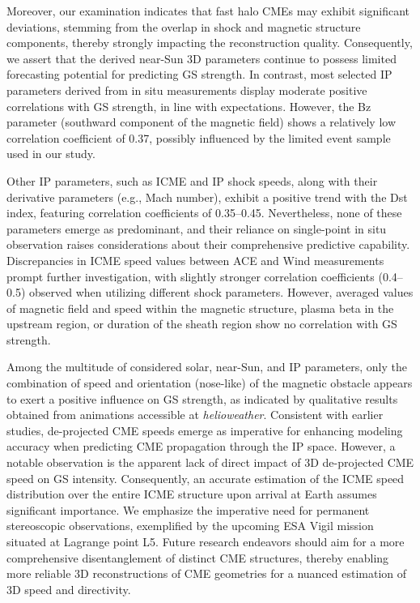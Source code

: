 Moreover, our examination indicates that fast halo CMEs may exhibit significant deviations, stemming from the overlap in shock and magnetic structure components, thereby strongly impacting the reconstruction quality. Consequently, we assert that the derived near-Sun 3D parameters continue to possess limited forecasting potential for predicting GS strength. In contrast, most selected IP parameters derived from in situ measurements display moderate positive correlations with GS strength, in line with expectations. However, the Bz parameter (southward component of the magnetic field) shows a relatively low correlation coefficient of 0.37, possibly influenced by the limited event sample used in our study.

Other IP parameters, such as ICME and IP shock speeds, along with their derivative parameters (e.g., Mach number), exhibit a positive trend with the Dst index, featuring correlation coefficients of 0.35–0.45. Nevertheless, none of these parameters emerge as predominant, and their reliance on single-point in situ observation raises considerations about their comprehensive predictive capability. Discrepancies in ICME speed values between ACE and Wind measurements prompt further investigation, with slightly stronger correlation coefficients (0.4–0.5) observed when utilizing different shock parameters. However, averaged values of magnetic field and speed within the magnetic structure, plasma beta in the upstream region, or duration of the sheath region show no correlation with GS strength.

Among the multitude of considered solar, near-Sun, and IP parameters, only the combination of speed and orientation (nose-like) of the magnetic obstacle appears to exert a positive influence on GS strength, as indicated by qualitative results obtained from animations accessible at \textit{helioweather}. Consistent with earlier studies, de-projected CME speeds emerge as imperative for enhancing modeling accuracy when predicting CME propagation through the IP space. However, a notable observation is the apparent lack of direct impact of 3D de-projected CME speed on GS intensity. Consequently, an accurate estimation of the ICME speed distribution over the entire ICME structure upon arrival at Earth assumes significant importance. We emphasize the imperative need for permanent stereoscopic observations, exemplified by the upcoming ESA Vigil mission situated at Lagrange point L5. Future research endeavors should aim for a more comprehensive disentanglement of distinct CME structures, thereby enabling more reliable 3D reconstructions of CME geometries for a nuanced estimation of 3D speed and directivity.

